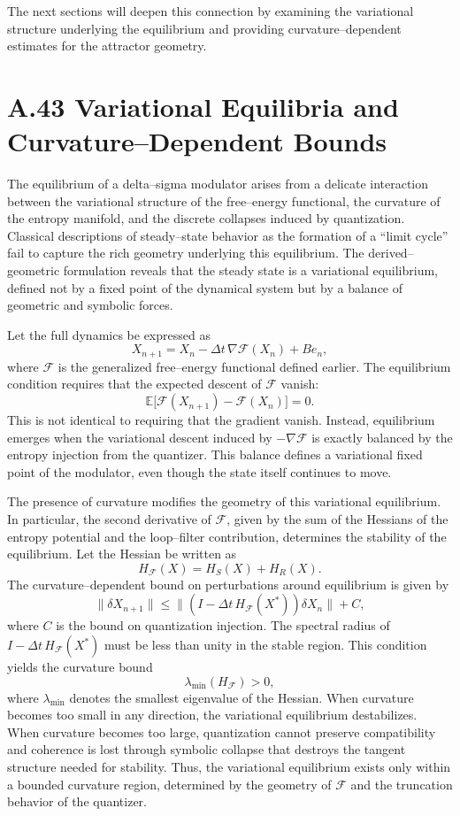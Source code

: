 The next sections will deepen this connection by examining the variational structure underlying the equilibrium and providing curvature–dependent estimates for the attractor geometry.

\section{A.43 Variational Equilibria and Curvature–Dependent Bounds}

The equilibrium of a delta–sigma modulator arises from a delicate interaction between the variational structure of the free–energy functional, the curvature of the entropy manifold, and the discrete collapses induced by quantization. Classical descriptions of steady–state behavior as the formation of a “limit cycle” fail to capture the rich geometry underlying this equilibrium. The derived–geometric formulation reveals that the steady state is a variational equilibrium, defined not by a fixed point of the dynamical system but by a balance of geometric and symbolic forces.

Let the full dynamics be expressed as
\[
X_{n+1} = X_n - \Delta t \, \nabla \mathcal{F}(X_n) + B e_n,
\]
where \(\mathcal{F}\) is the generalized free–energy functional defined earlier. The equilibrium condition requires that the expected descent of \(\mathcal{F}\) vanish:
\[
\mathbb{E}\bigl[ \mathcal{F}(X_{n+1}) - \mathcal{F}(X_n) \bigr] = 0.
\]
This is not identical to requiring that the gradient vanish. Instead, equilibrium emerges when the variational descent induced by \(-\nabla \mathcal{F}\) is exactly balanced by the entropy injection from the quantizer. This balance defines a variational fixed point of the modulator, even though the state itself continues to move.

The presence of curvature modifies the geometry of this variational equilibrium. In particular, the second derivative of \(\mathcal{F}\), given by the sum of the Hessians of the entropy potential and the loop–filter contribution, determines the stability of the equilibrium. Let the Hessian be written as
\[
H_{\mathcal{F}}(X) = H_S(X) + H_R(X).
\]
The curvature–dependent bound on perturbations around equilibrium is given by
\[
\| \delta X_{n+1} \| \le \| (I - \Delta t \, H_{\mathcal{F}}(X^\ast)) \delta X_n \| + C,
\]
where \(C\) is the bound on quantization injection. The spectral radius of \(I - \Delta t \, H_{\mathcal{F}}(X^\ast)\) must be less than unity in the stable region. This condition yields the curvature bound
\[
\lambda_{\min}(H_{\mathcal{F}}) > 0,
\]
where \(\lambda_{\min}\) denotes the smallest eigenvalue of the Hessian. When curvature becomes too small in any direction, the variational equilibrium destabilizes. When curvature becomes too large, quantization cannot preserve compatibility and coherence is lost through symbolic collapse that destroys the tangent structure needed for stability. Thus, the variational equilibrium exists only within a bounded curvature region, determined by the geometry of \(\mathcal{F}\) and the truncation behavior of the quantizer.

